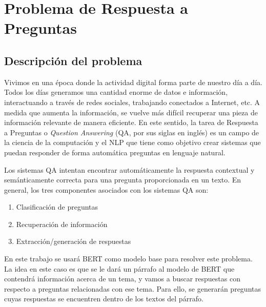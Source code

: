 
\section{Problema de Respuesta a Preguntas}
\label{section-preguntas-y-respuestas}


\subsection{Descripción del problema}
\label{subsection-qa-descripcion-problema}

Vivimos en una época donde la actividad digital forma parte de nuestro día a día. Todos los días generamos una cantidad enorme de datos e información, interactuando a través de redes sociales, trabajando conectados a Internet, etc. A medida que aumenta la información, se vuelve más difícil recuperar una pieza de información relevante de manera eficiente. En este sentido, la tarea de Respuesta a Preguntas o \textit{Question Answering} (QA, por sus siglas en inglés) es un campo de la ciencia de la computación y el NLP que tiene como objetivo crear sistemas que puedan responder de forma automática preguntas en lenguaje natural.  

Los sistemas QA intentan encontrar automáticamente la respuesta contextual y semánticamente correcta para una pregunta proporcionada en un texto. En general, los tres componentes asociados con los sistemas QA son:

\begin{enumerate}
    \item Clasificación de preguntas
    \item Recuperación de información
    \item Extracción/generación de respuestas
\end{enumerate}

En este trabajo se usará BERT como modelo base para resolver este problema. La idea en este caso es que se le dará un párrafo al modelo de BERT que contendrá información acerca de un tema, y vamos a buscar respuestas con respecto a preguntas relacionadas con ese tema. Para ello, se generarán preguntas cuyas respuestas se encuentren dentro de los textos del párrafo.

